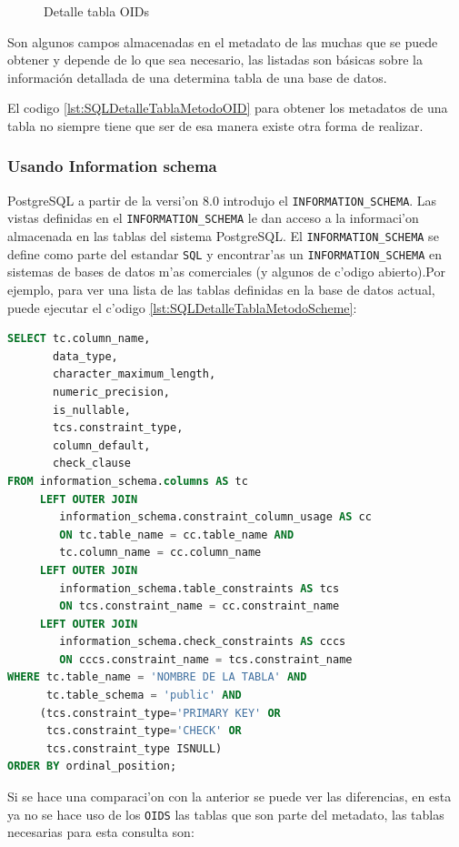 \begin{figure}[H]
\centering
{}
\caption{Detalle tabla OIDs} \label{fig:Detalle Metodo OID}
\end{figure}
Son algunos campos almacenadas en el metadato de las muchas que se puede obtener y depende de lo que sea necesario, las listadas son b\'asicas sobre la informaci\'on detallada de una determina tabla de una base de datos.

El codigo \ref{lst:SQLDetalleTablaMetodoOID} para obtener los metadatos de una tabla no siempre tiene que ser de esa manera existe otra forma de realizar.
\subsubsection{Usando Information schema}
PostgreSQL  a partir de la versi'on 8.0 introdujo el \texttt{INFORMATION\_SCHEMA}. Las vistas definidas en el \texttt{INFORMATION\_SCHEMA} le dan acceso a la informaci'on almacenada en las tablas del sistema PostgreSQL. El \texttt{INFORMATION\_SCHEMA} se define como parte del estandar \texttt{SQL} y encontrar'as un \texttt{INFORMATION\_SCHEMA} en sistemas de bases de datos m'as comerciales (y algunos de c'odigo abierto).Por ejemplo, para ver una lista de las tablas definidas en la base de datos actual, puede ejecutar el c'odigo \ref{lst:SQLDetalleTablaMetodoScheme}:

\begin{lstlisting}[caption={Query para detalle obtener el detalle de una tabla information scheme},label={lst:SQLDetalleTablaMetodoScheme},language=sql]
SELECT tc.column_name,
       data_type,
       character_maximum_length,
       numeric_precision,
       is_nullable,
       tcs.constraint_type,
       column_default,
       check_clause
FROM information_schema.columns AS tc
     LEFT OUTER JOIN
        information_schema.constraint_column_usage AS cc
     	ON tc.table_name = cc.table_name AND
        tc.column_name = cc.column_name
     LEFT OUTER JOIN
        information_schema.table_constraints AS tcs
     	ON tcs.constraint_name = cc.constraint_name
     LEFT OUTER JOIN
        information_schema.check_constraints AS cccs
     	ON cccs.constraint_name = tcs.constraint_name
WHERE tc.table_name = 'NOMBRE DE LA TABLA' AND
      tc.table_schema = 'public' AND
     (tcs.constraint_type='PRIMARY KEY' OR 
      tcs.constraint_type='CHECK' OR 
      tcs.constraint_type ISNULL)
ORDER BY ordinal_position;
\end{lstlisting}
Si se hace una comparaci'on con la anterior se puede ver las diferencias, en esta ya no se hace uso de los \texttt{OIDS} las tablas que son parte del metadato, las tablas necesarias para esta consulta son:

